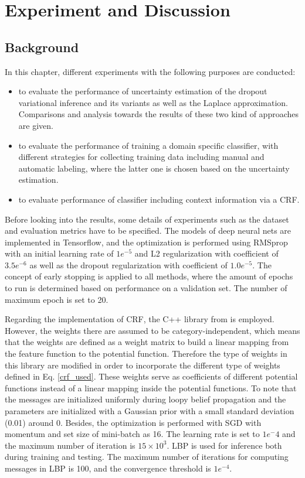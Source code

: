 
\chapter{Experiment and Discussion}

\section{Background}
In this chapter, different experiments with the following purposes are conducted:
\begin{itemize}
	\item to evaluate the performance of uncertainty estimation of the dropout variational inference and its variants as well as the Laplace approximation. Comparisons and analysis towards the results of these two kind of approaches are given.
	
	\item to evaluate the performance of training a domain specific classifier, with different strategies for collecting training data including manual and automatic labeling, where the latter one is chosen based on the uncertainty estimation.
	
	\item to evaluate performance of classifier including context information via a CRF.
\end{itemize}
Before looking into the results, some details of experiments such as the dataset and evaluation metrics have to be specified.
The models of deep neural nets are implemented in Tensorflow\cite{abadi2016tensorflow}, and the optimization is performed using RMSprop with an initial learning rate of $1e^{-5}$ and L2 regularization with coefficient of $3.5e^{-6}$ as well as the dropout regularization with coefficient of $1.0e^{-5}$.
The concept of early stopping is applied to all methods, where the amount of epochs to run is determined based on performance on a validation set.
The number of maximum epoch is set to 20. 

Regarding the implementation of CRF, the C++ library from \cite{Ruiz-Sarmiento-REACTS-2015} is employed.
However, the weights there are assumed to be category-independent, which means that the weights are defined as a weight matrix to build a linear mapping from the feature function to the potential function.
Therefore the type of weights in this library are modified in order to incorporate the different type of weights defined in Eq. \ref{crf_used}.
These weights serve as coefficients of different potential functions instead of a linear mapping inside the potential functions.
To note that the messages are initialized uniformly during loopy belief propagation and the parameters are initialized with a Gaussian prior with a small standard deviation (0.01) around 0.
Besides, the optimization is performed with \gls{SGD} with momentum and set size of mini-batch as 16.
The learning rate is set to $1e^-4$ and the maximum number of iteration is $15\times10^3$.
\gls{LBP} is used for inference both during training and testing.
The maximum number of iterations for computing messages in LBP is 100, and the convergence threshold is $1e^{-4}$.

